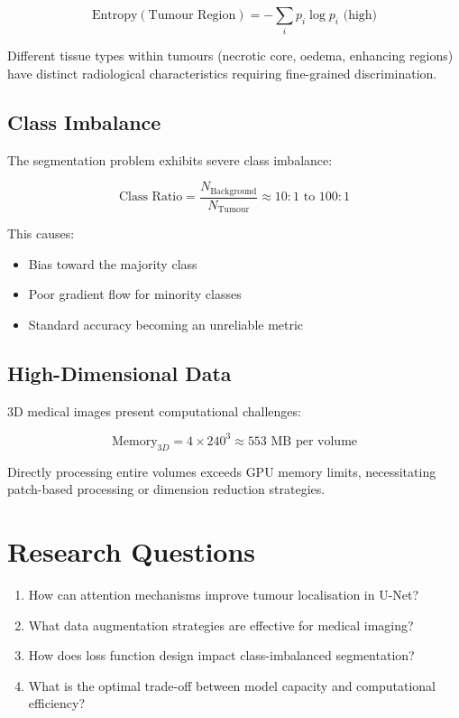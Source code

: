 \documentclass{ecsproject}     %
\begin{document}
\begin{equation}
\text{Entropy}(\text{Tumour Region}) = -\sum_{i} p_i \log p_i \text{ (high)}
\end{equation}

Different tissue types within tumours (necrotic core, oedema, enhancing regions) have distinct radiological characteristics requiring fine-grained discrimination.

\subsection{Class Imbalance}

The segmentation problem exhibits severe class imbalance:

\begin{equation}
\text{Class Ratio} = \frac{N_{\text{Background}}}{N_{\text{Tumour}}} \approx 10:1 \text{ to } 100:1
\end{equation}

This causes:
\begin{itemize}
    \item Bias toward the majority class
    \item Poor gradient flow for minority classes
    \item Standard accuracy becoming an unreliable metric
\end{itemize}

\subsection{High-Dimensional Data}

3D medical images present computational challenges:

\begin{equation}
\text{Memory}_{3D} = 4 \times 240^3 \approx 553 \text{ MB per volume}
\end{equation}

Directly processing entire volumes exceeds GPU memory limits, necessitating patch-based processing or dimension reduction strategies.

\section{Research Questions}

\begin{enumerate}
    \item How can attention mechanisms improve tumour localisation in U-Net?
    \item What data augmentation strategies are effective for medical imaging?
    \item How does loss function design impact class-imbalanced segmentation?
    \item What is the optimal trade-off between model capacity and computational efficiency?
\end{enumerate}
\end{document}
